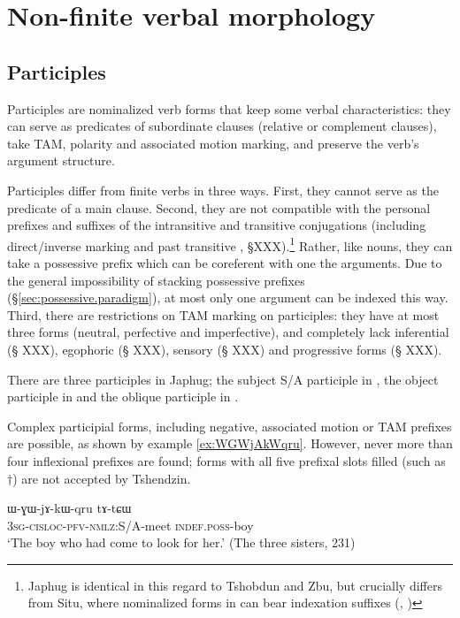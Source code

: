 \chapter{Non-finite verbal morphology}

\section{Participles}
Participles are nominalized verb forms that keep some verbal characteristics: they can serve as predicates of subordinate clauses (relative or complement clauses), take TAM, polarity and associated motion marking, and preserve the verb's argument structure.

Participles differ from finite verbs in three ways. First, they cannot serve as the predicate of a main clause. Second, they are not compatible with the personal prefixes and suffixes of the intransitive and transitive conjugations (including direct/inverse marking and past transitive , §XXX).\footnote{Japhug is identical in this regard to Tshobdun and Zbu, but crucially differs from Situ, where nominalized forms in  can bear indexation suffixes (\citet{jackson06guanxiju}, \citet{jacksonlin07}) } Rather, like nouns, they can take a possessive prefix which can be coreferent with one the arguments. Due to the general impossibility of stacking possessive prefixes (§\ref{sec:possessive.paradigm}), at most only one argument can be indexed this way. Third, there are restrictions on TAM marking on participles: they have at most three forms (neutral, perfective and imperfective), and completely lack inferential (§ XXX), egophoric (§ XXX), sensory (§ XXX) and progressive forms (§ XXX).

There are three participles in Japhug; the subject S/A participle in , the object participle in  and the oblique participle in . 

Complex participial forms, including negative, associated motion or TAM prefixes are possible, as shown by example \ref{ex:WGWjAkWqru}. However, never more than four inflexional prefixes are found; forms with all five prefixal slots filled (such as $\dagger$) are not accepted by Tshendzin.

 \begin{exe}
\ex \label{ex:WGWjAkWqru}
\gll ɯ-ɣɯ-jɤ-kɯ-qru tɤ-tɕɯ  \\
  \textsc{3sg}-\textsc{cisloc}-\textsc{pfv}-\textsc{nmlz}:S/A-meet \textsc{indef}.\textsc{poss}-boy   \\
\glt `The boy who had come to look for her.' (The three sisters, 231)
 \end{exe}

